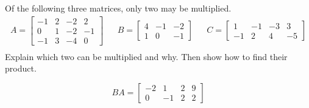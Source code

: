 
\begin{exerciseStatement}


Of the following three matrices, only two may be multiplied. 
\begin{align*} A= \left[\begin{array}{cccc}
-1 & 2 & -2 & 2 \\
0 & 1 & -2 & -1 \\
-1 & 3 & -4 & 0
\end{array}\right]  & & B= \left[\begin{array}{ccc}
4 & -1 & -2 \\
1 & 0 & -1
\end{array}\right]  & & C= \left[\begin{array}{cccc}
1 & -1 & -3 & 3 \\
-1 & 2 & 4 & -5
\end{array}\right]  \\ \end{align*}
             Explain which two can be multiplied and why. Then show how to find their product.


\end{exerciseStatement}
    
\begin{exerciseAnswer} 
\[BA= \left[\begin{array}{cccc}
-2 & 1 & 2 & 9 \\
0 & -1 & 2 & 2
\end{array}\right] \]
\end{exerciseAnswer}
    

